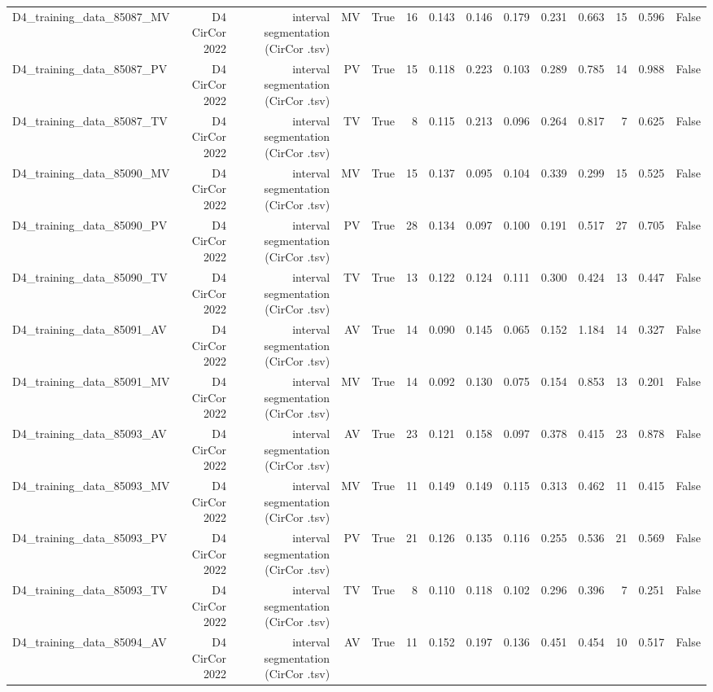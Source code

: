 \begin{table}[htbp]
\begin{tabular}{lrrrrrrrrrrrrr}
    D4\_training\_data\_85087\_MV & D4 CirCor 2022 & interval segmentation (CirCor .tsv) & MV & True & 16 & 0.143 & 0.146 & 0.179 & 0.231 & 0.663 & 15 & 0.596 & False \\
    D4\_training\_data\_85087\_PV & D4 CirCor 2022 & interval segmentation (CirCor .tsv) & PV & True & 15 & 0.118 & 0.223 & 0.103 & 0.289 & 0.785 & 14 & 0.988 & False \\
    D4\_training\_data\_85087\_TV & D4 CirCor 2022 & interval segmentation (CirCor .tsv) & TV & True & 8 & 0.115 & 0.213 & 0.096 & 0.264 & 0.817 & 7 & 0.625 & False \\
    D4\_training\_data\_85090\_MV & D4 CirCor 2022 & interval segmentation (CirCor .tsv) & MV & True & 15 & 0.137 & 0.095 & 0.104 & 0.339 & 0.299 & 15 & 0.525 & False \\
    D4\_training\_data\_85090\_PV & D4 CirCor 2022 & interval segmentation (CirCor .tsv) & PV & True & 28 & 0.134 & 0.097 & 0.100 & 0.191 & 0.517 & 27 & 0.705 & False \\
    D4\_training\_data\_85090\_TV & D4 CirCor 2022 & interval segmentation (CirCor .tsv) & TV & True & 13 & 0.122 & 0.124 & 0.111 & 0.300 & 0.424 & 13 & 0.447 & False \\
    D4\_training\_data\_85091\_AV & D4 CirCor 2022 & interval segmentation (CirCor .tsv) & AV & True & 14 & 0.090 & 0.145 & 0.065 & 0.152 & 1.184 & 14 & 0.327 & False \\
    D4\_training\_data\_85091\_MV & D4 CirCor 2022 & interval segmentation (CirCor .tsv) & MV & True & 14 & 0.092 & 0.130 & 0.075 & 0.154 & 0.853 & 13 & 0.201 & False \\
    D4\_training\_data\_85093\_AV & D4 CirCor 2022 & interval segmentation (CirCor .tsv) & AV & True & 23 & 0.121 & 0.158 & 0.097 & 0.378 & 0.415 & 23 & 0.878 & False \\
    D4\_training\_data\_85093\_MV & D4 CirCor 2022 & interval segmentation (CirCor .tsv) & MV & True & 11 & 0.149 & 0.149 & 0.115 & 0.313 & 0.462 & 11 & 0.415 & False \\
    D4\_training\_data\_85093\_PV & D4 CirCor 2022 & interval segmentation (CirCor .tsv) & PV & True & 21 & 0.126 & 0.135 & 0.116 & 0.255 & 0.536 & 21 & 0.569 & False \\
    D4\_training\_data\_85093\_TV & D4 CirCor 2022 & interval segmentation (CirCor .tsv) & TV & True & 8 & 0.110 & 0.118 & 0.102 & 0.296 & 0.396 & 7 & 0.251 & False \\
    D4\_training\_data\_85094\_AV & D4 CirCor 2022 & interval segmentation (CirCor .tsv) & AV & True & 11 & 0.152 & 0.197 & 0.136 & 0.451 & 0.454 & 10 & 0.517 & False \\

\end{tabular}
\end{table}
